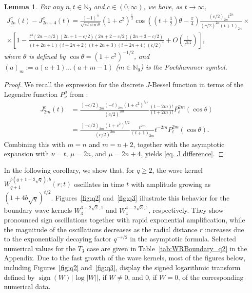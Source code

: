 \documentclass[12pt]{amsart}
\numberwithin{equation}{section}
\newtheorem{lemma}[theorem]{Lemma}
\theoremstyle{boldremark}
\begin{document}
\begin{lemma}
    For any $n,t\in\mathbb{N}_0$ and $c\in(0,\infty)$, we have, as $t\to\infty$,
\begin{multline}\label{eq. J difference}
J_{2n}^c(t) - J_{2n+4}^c(t)=\frac{(-1)^n}{\sqrt{\pi t\sin\theta}}\left( 1+c^2
\right) ^{\frac{t}{2}}\cos \left( \left( t+\frac{1}{2}\right)
\theta -\frac{\pi}{4} \right)\frac{(c/2)_{2n}t^{2n}}{(c/2)^{2n}(t+1)_{2n}}\times\\
\times \left[1-\frac{t^4(2n-c/2)(2n+1-c/2)(2n+2-c/2)(2n+3-c/2) }{(t+2n+1)(t+2n+2)(t+2n+3)(t+2n+4) (c/2)^4} + O\left(\frac{1}{t^{3/2}}\right)\right],
\end{multline}
where $\theta$ is defined by $\cos\theta=(1+c^2)^{-1/2}$, and $(a)_m:=a(a+1)\ldots (a+m-1)$ ($m\in\mathbb{N}_0$) is the Pochhammer symbol.
\end{lemma}
\begin{proof}
We recall the expression for the discrete $J$-Bessel function in terms of the Legendre function $P_\nu^\mu$ from \cite[Proof of Theorem 2]{BSS24}:
\begin{align*}
J_{2m}^c(t)&=\frac{(-c/2)_{2m} (-t)_{2m} (1+c^2)^{t/2}}{(c/2)^{2m}}\frac{(t-2m)!}{(t+2m)!}P_t^{2m}(\cos\theta) \\ &= \frac{(-c/2)_{2m} (1+c^2)^{t/2}}{(c/2)^{2m}}\frac{t^{2m}}{(t+1)_{2m}} t^{-2m}P_t^{2m}(\cos\theta).
\end{align*}
Combining this with $m=n$ and $m=n+2$, together with the asymptotic expansion \cite[formula 8.721.4]{GR} with $\nu=t$, $\mu=2n$, and $\mu=2n+4$, yields \eqref{eq. J difference}.
\end{proof}

In the following corollary, we show that, for $q\geq 2$, the wave kernel $W_{q+1}^{b(q+1-2\sqrt{q}),b}(r;t)$ oscillates in time $t$ with amplitude growing as $\left( 1+4b\sqrt{q}\right) ^{t/2}$. Figures~\ref{fig:q2} and~\ref{fig:q3} illustrate this behavior for the boundary wave kernels $W_3^{3-2\sqrt2,1}$ and $W_4^{4-2\sqrt3,1}$, respectively. They show pronounced sign oscillations together with rapid exponential amplification, while the magnitude of the oscillations decreases as the radial distance $r$ increases due to the exponentially decaying factor $q^{-r/2}$ in the asymptotic formula. Selected numerical values for the $T_3$ case are given in Table~\ref{tab:WRBoundary_q2} in the Appendix. Due to the fast growth of the wave kernels, most of the figures below, including Figures~\ref{fig:q2} and~\ref{fig:q3}, display the signed logarithmic transform defined by $\operatorname{sign}(W)\,|\log|W||$, if $W\neq 0$, and $0$, if $W=0$, of the corresponding numerical data.
\end{document}
